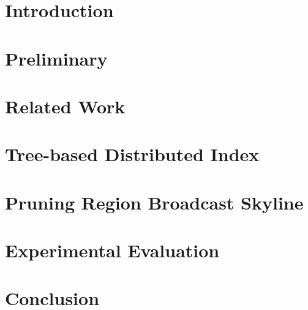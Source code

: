 
\section{Introduction}\label{sec-intro}


\section{Preliminary}\label{sec-prelim}


\section{Related Work}\label{sec-related}


\section{Tree-based Distributed Index}\label{sec-index}


\section{Pruning Region Broadcast Skyline}\label{sec-pruning}


\section{Experimental Evaluation}\label{sec-exp}


\section{Conclusion}\label{bsky-conc}


%



%
%

%
